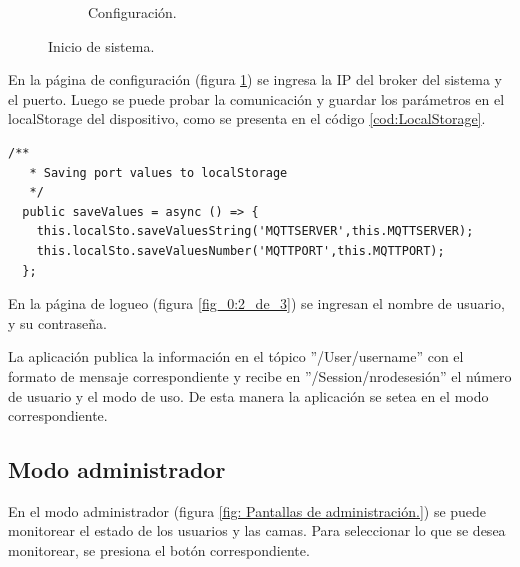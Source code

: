 \begin{figure}[!htpb]
\begin{subfigure}[b]{0.3\textwidth}
         \caption{Configuración.}
         \label{fig_0:3_de_3}
     \end{subfigure}
        \caption{Inicio de sistema.}
        \label{fig:Pantalla inicial, configuración y acceso de la aplicación.}
\end{figure}

En la página de configuración (figura \ref{fig_0:3_de_3}) se ingresa la IP del broker del sistema y el puerto. Luego se puede probar la comunicación y guardar los parámetros en el localStorage del dispositivo, como se presenta en el código \ref{cod:LocalStorage}.

\begin{lstlisting}[label=cod:LocalStorage,caption=  Funciones del servicio que guardan en el localStorage.]
  /**
   * Saving port values to localStorage
   */
  public saveValues = async () => {     
    this.localSto.saveValuesString('MQTTSERVER',this.MQTTSERVER);
    this.localSto.saveValuesNumber('MQTTPORT',this.MQTTPORT);
  };
\end{lstlisting}

En la página de logueo (figura \ref{fig_0:2_de_3}) se ingresan el nombre de usuario, y su contraseña.

La aplicación publica la información en el tópico ''/User/username'' con el formato de mensaje correspondiente y recibe en ''/Session/nrodesesión'' el número de usuario y el modo de uso. De esta manera la aplicación se setea en el modo correspondiente.



\subsection{Modo administrador}
En el modo administrador (figura \ref{fig: Pantallas de administración.}) se puede monitorear el estado de los usuarios y las camas. Para seleccionar lo que se desea monitorear, se presiona el botón correspondiente.

